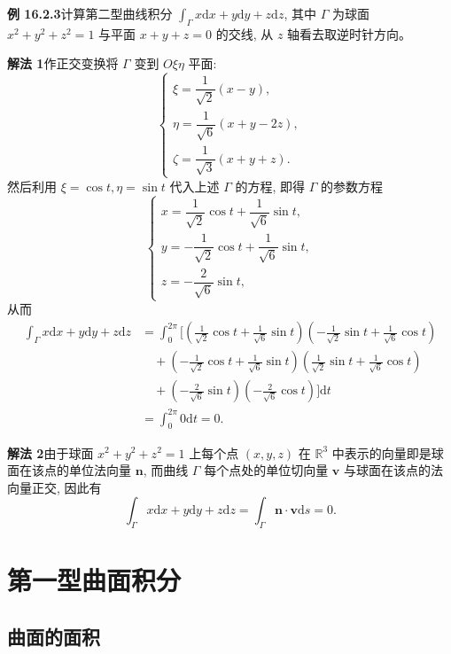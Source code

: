 \documentclass[UTF8, 12pt, fontset=fandol, oneside]{ctexart}
\begin{document}
\noindent\textbf{例 16.2.3}\quad 计算第二型曲线积分 $\int_\Gamma x\mathrm dx+y\mathrm dy+z\mathrm dz$, 其中 $\Gamma$ 为球面 $x^2+y^2+z^2=1$ 与平面 $x+y+z=0$ 的交线, 从 $z$ 轴看去取逆时针方向。

\noindent\textbf{解法 1}\quad 作正交变换将 $\Gamma$ 变到 $O\xi\eta$ 平面:
\[
  \begin{cases}
    \xi=\dfrac1{\sqrt2}(x-y),\\
    \eta=\dfrac1{\sqrt6}(x+y-2z),\\
    \zeta=\dfrac1{\sqrt3}(x+y+z).
  \end{cases}
\]
然后利用 $\xi=\cos t,\eta=\sin t$ 代入上述 $\Gamma$ 的方程, 即得 $\Gamma$ 的参数方程
\[
  \begin{cases}
    x=\dfrac1{\sqrt2}\cos t+\dfrac1{\sqrt6}\sin t,\\
    y=-\dfrac1{\sqrt2}\cos t+\dfrac1{\sqrt6}\sin t,\\
    z=-\dfrac2{\sqrt6}\sin t,
  \end{cases}
\]
从而
\[
\begin{aligned}
  \int_\Gamma x\mathrm dx+y\mathrm dy+z\mathrm dz
  &=\int_0^{2\pi}\bigg[
    \left(\frac1{\sqrt2}\cos t+\frac1{\sqrt6}\sin t\right)
    \left(-\frac1{\sqrt2}\sin t+\frac1{\sqrt6}\cos t\right)\\
  &\quad+
    \left(-\frac1{\sqrt2}\cos t+\frac1{\sqrt6}\sin t\right)
    \left(\frac1{\sqrt2}\sin t+\frac1{\sqrt6}\cos t\right)\\
  &\quad+
    \left(-\frac2{\sqrt6}\sin t\right)
    \left(-\frac2{\sqrt6}\cos t\right)
  \bigg]\mathrm dt\\
  &=\int_0^{2\pi}0\mathrm dt=0.
\end{aligned}
\]

\noindent\textbf{解法 2}\quad 由于球面 $x^2+y^2+z^2=1$ 上每个点 $(x,y,z)$ 在 $\mathbb R^3$ 中表示的向量即是球面在该点的单位法向量 $\boldsymbol n$, 而曲线 $\Gamma$ 每个点处的单位切向量 $\boldsymbol v$ 与球面在该点的法向量正交, 因此有
\[
  \int_\Gamma x\mathrm dx+y\mathrm dy+z\mathrm dz
  =\int_\Gamma \boldsymbol n\cdot\boldsymbol v\mathrm ds=0.
\]

\section{第一型曲面积分}

\subsection{曲面的面积}
\end{document}
